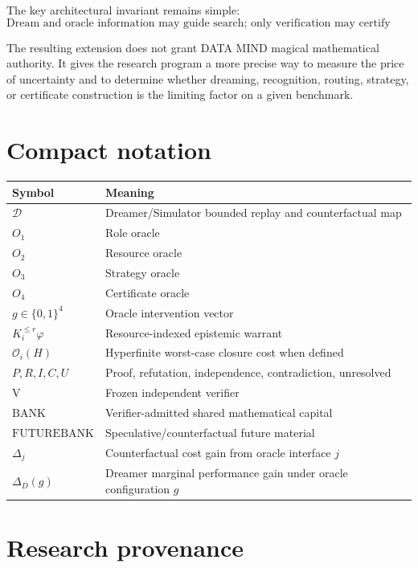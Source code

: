 \documentclass[11pt]{article}
\newcommand{\BANK}{\mathrm{BANK}}
\newcommand{\FBANK}{\mathrm{FUTUREBANK}}
\newcommand{\V}{\mathrm{V}}
\newcommand{\Dream}{\mathcal D}
\begin{document}
The key architectural invariant remains simple:
\begin{equation}
\boxed{
\text{Dream and oracle information may guide search; only verification may certify mathematics.}
}
\end{equation}

The resulting extension does not grant DATA MIND magical mathematical authority. It gives the research program a more precise way to measure the price of uncertainty and to determine whether dreaming, recognition, routing, strategy, or certificate construction is the limiting factor on a given benchmark.

\appendix
\section{Compact notation}

\begin{center}
\begin{tabular}{p{}p{}}
\toprule
Symbol & Meaning \\
\midrule
$\Dream$ & Dreamer/Simulator bounded replay and counterfactual map \\
$O_1$ & Role oracle \\
$O_2$ & Resource oracle \\
$O_3$ & Strategy oracle \\
$O_4$ & Certificate oracle \\
$g\in\{0,1\}^4$ & Oracle intervention vector \\
$K_i^{\le r}\varphi$ & Resource-indexed epistemic warrant \\
$\mathcal O_i(H)$ & Hyperfinite worst-case closure cost when defined \\
$P,R,I,C,U$ & Proof, refutation, independence, contradiction, unresolved \\
$\V$ & Frozen independent verifier \\
$\BANK$ & Verifier-admitted shared mathematical capital \\
$\FBANK$ & Speculative/counterfactual future material \\
$\Delta_j$ & Counterfactual cost gain from oracle interface $j$ \\
$\Delta_D(g)$ & Dreamer marginal performance gain under oracle configuration $g$ \\
\bottomrule
\end{tabular}
\end{center}

\section{Research provenance}
\end{document}
